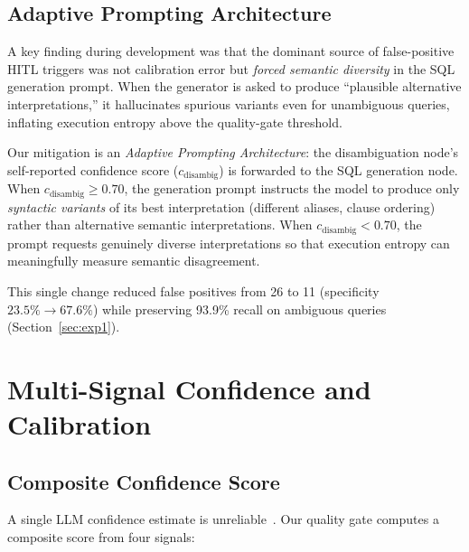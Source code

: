 \documentclass{article}
\begin{document}
\subsection{Adaptive Prompting Architecture}
\label{sec:adaptive}

A key finding during development was that the dominant source of false-positive
HITL triggers was not calibration error but \emph{forced semantic diversity} in
the SQL generation prompt.  When the generator is asked to produce ``plausible
alternative interpretations,'' it hallucinates spurious variants even for
unambiguous queries, inflating execution entropy above the quality-gate
threshold.

Our mitigation is an \emph{Adaptive Prompting Architecture}: the disambiguation
node's self-reported confidence score ($c_{\text{disambig}}$) is forwarded to
the SQL generation node. When $c_{\text{disambig}} \geq 0.70$, the generation
prompt instructs the model to produce only \emph{syntactic variants} of its
best interpretation (different aliases, clause ordering) rather than alternative
semantic interpretations.  When $c_{\text{disambig}} < 0.70$, the prompt
requests genuinely diverse interpretations so that execution entropy can
meaningfully measure semantic disagreement.

This single change reduced false positives from 26 to 11 (specificity
$23.5\% \to 67.6\%$) while preserving 93.9\% recall on ambiguous queries
(Section~\ref{sec:exp1}).

\section{Multi-Signal Confidence and Calibration}
\label{sec:method}

\subsection{Composite Confidence Score}

A single LLM confidence estimate is unreliable~\citep{calibration_llm}.
Our quality gate computes a composite score from four signals:
\end{document}
